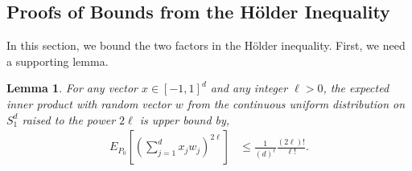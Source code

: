 \documentclass{article}
\numberwithin{equation}{section}
\theoremstyle{Lemma}
\newtheorem{lemma}{Lemma}
\theoremstyle{Corollary}
\theoremstyle{Theorem}
\theoremstyle{Remark}
\begin{document}
\subsection{\textbf{Proofs of Bounds from the H{\"o}lder Inequality}}\label{app_holder_pfs}
In this section, we bound the two factors in the H{\"o}lder inequality. First, we need a supporting lemma.
\begin{lemma} \label{cont_dir_lemma}
For any vector $x \in [-1,1]^{d}$ and any integer $\ell>0$, the expected inner product with random vector $w$ from the continuous uniform distribution on $S^{d}_{1}$ raised to the power $2\ell$ is upper bound by,
\begin{align}
    E_{P_{0}}[(\sum_{j=1}^{d}x_{j}w_{j})^{2\ell}]&\leq \frac{1}{(d)^{\ell}}\frac{(2\ell)!}{\ell!}.
\end{align}
    
\end{lemma}
\end{document}
